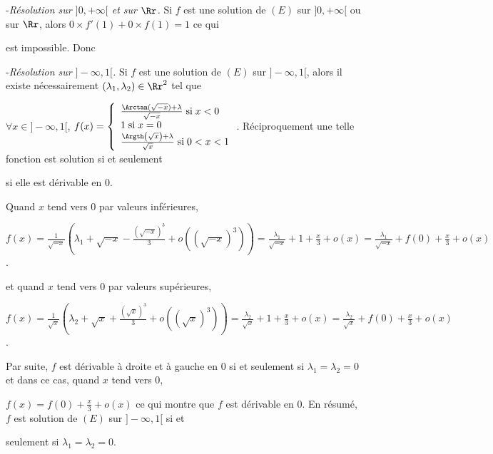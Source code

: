 {\begin{enumerate}
{-\textit{Résolution sur $]0,+\infty[$ et sur $\Rr$.} Si $f$ est une solution de $(E)$ sur $]0,+\infty[$ ou sur $\Rr$, alors $0\times f'(1)+0\times f(1)=1$ ce qui

est impossible. Donc

\begin{center}
\shadowbox{
$\mathcal{S}_{]0,+\infty[}=\varnothing$ et $\mathcal{S}_{\Rr}=\varnothing$.
}
\end{center}

-\textit{Résolution sur $]-\infty,1[$.} Si $f$ est une solution de $(E)$ sur $]-\infty,1[$, alors il existe nécessairement $(\lambda_1,\lambda_2)\in\Rr^2$ tel que

$\forall x\in]-\infty,1[$, $f(x)=\left\{
\begin{array}{l}
 \frac{\Arctan(\sqrt{-x})+\lambda}{\sqrt{-x}}\;\text{si}\;x<0\\
1\;\text{si}\;x=0\\
 \frac{\Argth\left(\sqrt{x}\right)+\lambda}{\sqrt{x}}\;\text{si}\;0<x<1
\end{array}
\right.$. Réciproquement une telle fonction est solution si et seulement

si elle est dérivable en $0$.

Quand $x$ tend vers $0$ par valeurs inférieures,

\begin{center}
$f(x)= \frac{1}{\sqrt{-x}}\left(\lambda_1+\sqrt{-x}- \frac{\left(\sqrt{-x}\right)^3}{3}+o\left((\sqrt{-x})^3\right)\right)= \frac{\lambda_1}{\sqrt{-x}}+1+ \frac{x}{3}+o(x)= \frac{\lambda_1}{\sqrt{-x}}+f(0)+ \frac{x}{3}+o(x)$.
\end{center}

et quand $x$ tend vers $0$ par valeurs supérieures,

\begin{center}
$f(x)= \frac{1}{\sqrt{x}}\left(\lambda_2+\sqrt{x}+ \frac{\left(\sqrt{x}\right)^3}{3}+o\left((\sqrt{x})^3\right)\right)= \frac{\lambda_2}{\sqrt{x}}+1+ \frac{x}{3}+o(x)= \frac{\lambda_2}{\sqrt{x}}+f(0)+ \frac{x}{3}+o(x)$.
\end{center}

Par suite, $f$ est dérivable à droite et à gauche en $0$ si et seulement si $\lambda_1=\lambda_2=0$ et dans ce cas, quand $x$ tend vers $0$,

$f(x)=f(0)+ \frac{x}{3}+o(x)$ ce qui montre que $f$ est dérivable en $0$. En résumé, $f$ est solution de $(E)$ sur $]-\infty,1[$ si et

seulement si $\lambda_1=\lambda_2=0$.

}
\end{enumerate}}
